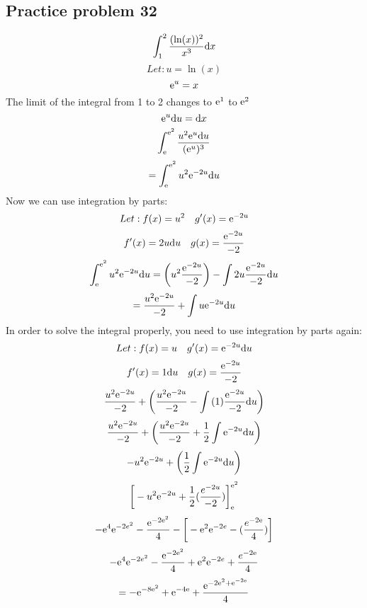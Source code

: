\documentclass[letterpaper, 12pt]{math}
\begin{document}
\subsection*{Practice problem 32}
\[ \int_{1}^{2}{\frac{(\ln(x))^2}{x^{3}}\mathrm{d}{x}} \]
\[ Let: u = \ln(x) \]
\[ \mathrm{e}^{u} = x \]
The limit of the integral from 1 to 2 changes to \( \mathrm{e}^{1} \) to \( \mathrm{e}^{2} \)
\[ \mathrm{e}^{u}\mathrm{d}{u} = \mathrm{d}{x} \]
\[ \int_{\mathrm{e}}^{\mathrm{e}^{2}}{\frac{u^{2}\mathrm{e}^{u}\mathrm{d}{u}}{(\mathrm{e}^{u})^{3}}} \]
\[ = \int_{\mathrm{e}}^{\mathrm{e}^{2}}{u^{2}\mathrm{e}^{-2u}\mathrm{d}{u}} \]
Now we can use integration by parts:
\[ Let: f(x) = u^{2} \quad g'(x) = \mathrm{e}^{-2u} \]
\[ f'(x) = 2u\mathrm{d}{u} \quad g(x) = \frac{\mathrm{e}^{-2u}}{-2} \]
\[ \int_{\mathrm{e}}^{\mathrm{e}^{2}}{u^{2}\mathrm{e}^{-2u}\mathrm{d}{u}} =
   \bigg(u^{2}\frac{\mathrm{e}^{-2u}}{-2}\bigg)-\int{2u\frac{\mathrm{e}^{-2u}}{-2}\mathrm{d}{u}} \]
\[ = \frac{u^{2}\mathrm{e}^{-2u}}{-2}+\int{u\mathrm{e}^{-2u}\mathrm{d}{u}} \]
In order to solve the integral properly, you need to use integration by parts
again:
\[ Let: f(x) = u \quad g'(x) = \mathrm{e}^{-2u}\mathrm{d}{u} \]
\[ f'(x) = 1\mathrm{d}{u} \quad g(x) = \frac{\mathrm{e}^{-2u}}{-2} \]
\[ \frac{u^{2}\mathrm{e}^{-2u}}{-2}+
   \bigg(\frac{u^{2}\mathrm{e}^{-2u}}{-2}-\int{(1)\frac{\mathrm{e}^{-2u}}{-2}\mathrm{d}{u}}\bigg) \]
\[ \frac{u^{2}\mathrm{e}^{-2u}}{-2}+
   \bigg(\frac{u^{2}\mathrm{e}^{-2u}}{-2}+\frac{1}{2}\int{\mathrm{e}^{-2u}\mathrm{d}{u}}\bigg) \]
\[ -u^{2}\mathrm{e}^{-2u}+\bigg(\frac{1}{2}\int{\mathrm{e}^{-2u}\mathrm{d}{u}}\bigg) \]
\[ \bigg[-u^{2}\mathrm{e}^{-2u}+\frac{1}{2}(\frac{e^{-2u}}{-2})\bigg]_{\mathrm{e}}^{\mathrm{e}^{2}} \]
\[ -\mathrm{e}^{4}\mathrm{e}^{-2e^{2}}-\frac{\mathrm{e}^{-2\mathrm{e}^{2}}}{4}-
   \bigg[-\mathrm{e}^{2}\mathrm{e}^{-2e}-(\frac{e^{-2\mathrm{e}}}{4})\bigg] \]
\[ -\mathrm{e}^{4}\mathrm{e}^{-2e^{2}}-\frac{\mathrm{e}^{-2\mathrm{e}^{2}}}{4}+
   \mathrm{e}^{2}\mathrm{e}^{-2e}+\frac{e^{-2\mathrm{e}}}{4} \]
\[ = -\mathrm{e}^{-8\mathrm{e}^{2}}+\mathrm{e}^{-4\mathrm{e}}+\frac{\mathrm{e}^{-2\mathrm{e}^{2}+\mathrm{e}^{-2\mathrm{e}}}}{4} \]
\end{document}
